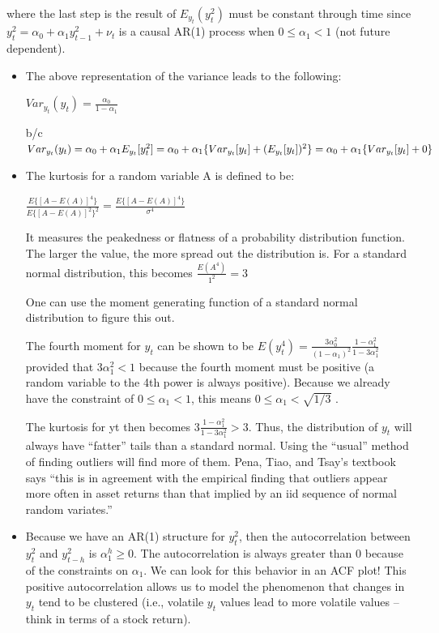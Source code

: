\documentclass[
]{book}
\theoremstyle{definition}
\theoremstyle{definition}
\theoremstyle{definition}
\theoremstyle{definition}
\theoremstyle{remark}
\begin{document}
where the last step is the result of \(E_{y_t}(y_t^2)\) must be constant through time since \(y_t^2= \alpha_0+\alpha_1y^2_{t-1} + \nu_t\) is a causal AR(1) process when \(0 \le \alpha_1 < 1\) (not future dependent).

\begin{itemize}
\item
  The above representation of the variance leads to the following:

  \(Var_{y_t}(y_t)=\frac{\alpha_0}{1-\alpha_1}\)

  b/c \(Var_{y_t}(y_t)=\alpha_0+\alpha_1E_{y_t}[y_t^2]\\=\alpha_0+\alpha_1\{Var_{y_t}[y_t]+(E_{y_t}[y_t])^2\}\\=\alpha_0+\alpha_1\{Var_{y_t}[y_t]+0\}\)
\item
  The kurtosis for a random variable A is defined to be:

  \(\frac{E\{[A-E(A)]^4\}}{E\{[A-E(A)]^2\}^2}=\frac{E\{[A-E(A)]^4\}}{\sigma^4}\)

  It measures the peakedness or flatness of a probability distribution function. The larger the value, the more spread out the distribution is. For a standard normal distribution, this becomes \(\frac{E(A^4)}{1^2}=3\)

  One can use the moment generating function of a standard normal distribution to figure this out.

  The fourth moment for \(y_t\) can be shown to be \(E(y_t^4)=\frac{3\alpha_0^2}{(1-\alpha_1)^2}\frac{1-\alpha_1^2}{1-3\alpha_1^2}\) provided that \(3\alpha_1^2 < 1\) because the fourth moment must be positive (a random variable to the 4th power is always positive). Because we already have the constraint of \(0 \le \alpha_1 < 1\), this means \(0 \le \alpha_1 < \sqrt{1/3}\) .

  The kurtosis for yt then becomes \(3\frac{1-\alpha_1^2}{1-3\alpha_1^2} > 3\). Thus, the distribution of \(y_t\) will always have ``fatter'' tails than a standard normal. Using the ``usual'' method of finding outliers will find more of them. Pena, Tiao, and Tsay's textbook says ``this is in agreement with the empirical finding that outliers appear more often in asset returns than that implied by an iid sequence of normal random variates.''
\item
  Because we have an AR(1) structure for \(y_t^2\), then the autocorrelation between \(y_t^2\) and \(y_{t-h}^2\) is \(\alpha_1^h\ge 0\). The autocorrelation is always greater than 0 because of the constraints on \(\alpha_1\). We can look for this behavior in an ACF plot! This positive autocorrelation allows us to model the phenomenon that changes in \(y_t\) tend to be clustered (i.e., volatile \(y_t\) values lead to more volatile values -- think in terms of a stock return).
\end{itemize}
\end{document}
